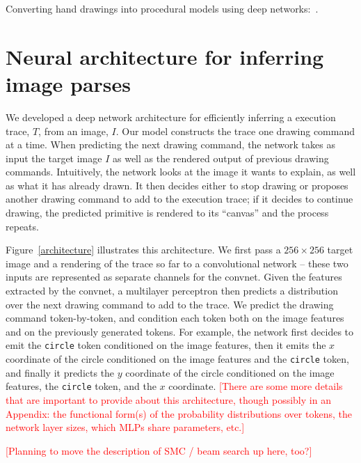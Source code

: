 \documentclass{article}
\newcommand{\remark}[1]{\textcolor{red}{[#1]}}
\begin{document}
Converting hand drawings into procedural models using deep networks:~\cite{huang2017shape,Nishida:2016:ISU:2897824.2925951}.



\section{Neural architecture for inferring image parses}

We developed a deep network architecture for efficiently inferring a
execution trace, $T$, from an image, $I$.  Our model constructs the
trace one drawing command at a time.  When predicting the next drawing
command, the network takes as input the target image $I$ as well as
the rendered output of previous drawing commands.  Intuitively, the
network looks at the image it wants to explain, as well as what it has
already drawn.  It then decides either to stop drawing or proposes
another drawing command to add to the execution trace; if it decides
to continue drawing, the predicted primitive is rendered to its
``canvas'' and the process repeats.

Figure~\ref{architecture} illustrates this architecture.  We first
pass a $256\times 256$ target image and a rendering of the trace so
far to a convolutional network -- these two inputs are represented as
separate channels for the convnet. Given the features extracted by the
convnet, a multilayer perceptron then predicts a distribution over the
next drawing command to add to the trace.  We predict the drawing
command token-by-token, and condition each token both on the image
features and on the previously generated tokens.  For example, the
network first decides to emit the \verb|circle| token conditioned on
the image features, then it emits the $x$ coordinate of the circle
conditioned on the image features and the \verb|circle| token, and
finally it predicts the $y$ coordinate of the circle conditioned on
the image features, the \verb|circle| token, and the $x$ coordinate.
\remark{There are some more details that are important to provide
  about this architecture, though possibly in an Appendix: the
  functional form(s) of the probability distributions over tokens, the
  network layer sizes, which MLPs share parameters, etc.}

\remark{Planning to move the description of SMC / beam search up here, too?}
\end{document}
